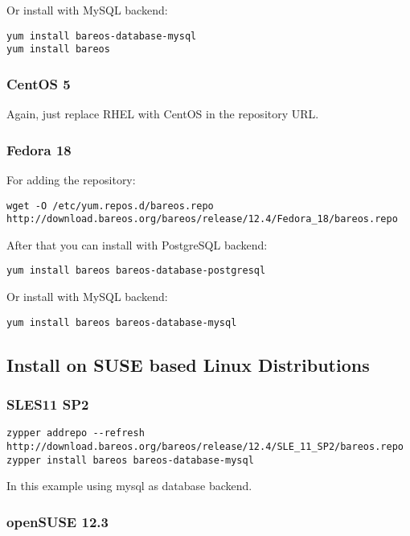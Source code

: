 Or install with MySQL backend:
\begin{verbatim}
yum install bareos-database-mysql
yum install bareos
\end{verbatim}

\subsubsection{CentOS 5}

Again, just replace RHEL with CentOS in the repository URL.

\subsubsection{Fedora 18}

For adding the repository:
\begin{verbatim}
wget -O /etc/yum.repos.d/bareos.repo http://download.bareos.org/bareos/release/12.4/Fedora_18/bareos.repo
\end{verbatim}

After that you can install with PostgreSQL backend:
\begin{verbatim}
yum install bareos bareos-database-postgresql
\end{verbatim}

Or install with MySQL backend:
\begin{verbatim}
yum install bareos bareos-database-mysql
\end{verbatim}

\subsection{Install on SUSE based Linux Distributions}

\subsubsection{SLES11 SP2}

\begin{verbatim}
zypper addrepo --refresh http://download.bareos.org/bareos/release/12.4/SLE_11_SP2/bareos.repo
zypper install bareos bareos-database-mysql
\end{verbatim}
In this example using mysql as database backend.

\subsubsection{openSUSE 12.3}

